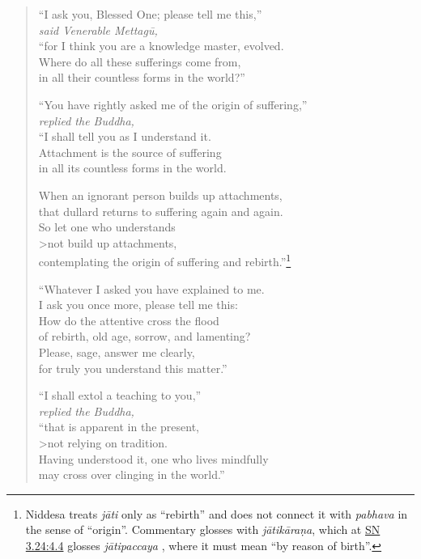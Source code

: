 \documentclass[12pt,openany]{book}%
\newcommand*{\scspeaker}[1]{\hspace{2em}\textit{#1}}
\begin{document}
\begin{verse}%
“I ask you, Blessed One; please tell me this,” \\
\scspeaker{said Venerable \textsanskrit{Mettagū}, }\\
“for I think you are a knowledge master, evolved. \\
Where do all these sufferings come from, \\
in all their countless forms in the world?” 

“You have rightly asked me of the origin of suffering,” \\
\scspeaker{replied the Buddha, }\\
“I shall tell you as I understand it. \\
Attachment is the source of suffering \\
in all its countless forms in the world. 

When an ignorant person builds up attachments, \\
that dullard returns to suffering again and again. \\
So let one who understands \\>not build up attachments, \\
contemplating the origin of suffering and rebirth.”\footnote{Niddesa treats \textit{\textsanskrit{jāti}} only as “rebirth” and does not connect it with \textit{pabhava} in the sense of “origin”. Commentary glosses with \textit{\textsanskrit{jātikāraṇa}}, which at \href{https://suttacentral.net/sn3.24/en/sujato\#4.4}{SN 3.24:4.4} glosses \textit{\textsanskrit{jātipaccaya}} , where it must mean “by reason of birth”. } 

“Whatever I asked you have explained to me. \\
I ask you once more, please tell me this: \\
How do the attentive cross the flood \\
of rebirth, old age, sorrow, and lamenting? \\
Please, sage, answer me clearly, \\
for truly you understand this matter.” 

“I shall extol a teaching to you,” \\
\scspeaker{replied the Buddha, }\\
“that is apparent in the present, \\>not relying on tradition. \\
Having understood it, one who lives mindfully \\
may cross over clinging in the world.” 


\end{verse}
\end{document}
